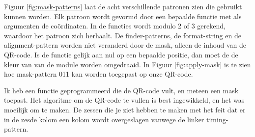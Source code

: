 \documentclass[a4paper]{article}
\begin{document}
Figuur \ref{fig:mask-patterns} laat de acht verschillende patronen zien die gebruikt kunnen worden. Elk patroon wordt gevormd door een bepaalde functie met als argumenten de coördinaten. In de functies wordt modulo 2 of 3 gerekend, waardoor het patroon zich herhaalt. De finder-patterns, de format-string en de alignment-pattern worden niet veranderd door de mask, alleen de inhoud van de QR-code. Is de functie gelijk aan nul op een bepaalde positie, dan moet de de kleur van van de module worden omgedraaid. In Figuur \ref{fig:apply-mask} is te zien hoe mask-pattern 011 kan worden toegepast op onze QR-code.

Ik heb een functie geprogrammeerd die de QR-code vult, en meteen een mask toepast. Het algoritme om de QR-code te vullen is best ingewikkeld, en het was moeilijk om te maken. De zessen die je ziet hebben te maken met het feit dat er in de zesde kolom een kolom wordt overgeslagen vanwege de linker timing-pattern.
\end{document}
